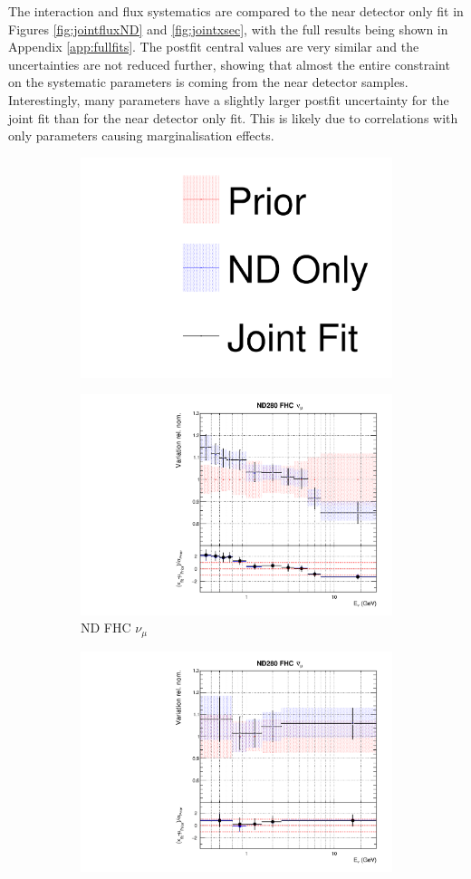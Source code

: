 The interaction and flux systematics are compared to the near detector only fit in Figures \ref{fig:jointfluxND} and \ref{fig:jointxsec}, with the full results being shown in Appendix \ref{app:fullfits}. The postfit central values are very similar and the uncertainties are not reduced further, showing that almost the entire constraint on the systematic parameters is coming from the near detector samples. Interestingly, many parameters have a slightly larger postfit uncertainty for the joint fit than for the near detector only fit. This is likely due to correlations with \SK only parameters causing marginalisation effects.

\begin{figure}[!htbp]
\centering
\begin{subfigure}{0.8\textwidth}
  \centering
  \includegraphics[width=0.24\linewidth]{figs/joint_leg}
\end{subfigure}
\begin{subfigure}{0.49\textwidth}
  \centering
  \includegraphics[width=0.99\linewidth]{figs/jointflux0}
  \caption{ND FHC $\nu_{\mu}$}
\end{subfigure}
\begin{subfigure}{0.49\textwidth}
  \centering
  \includegraphics[width=0.99\linewidth]{figs/jointflux1}

\end{subfigure}
\end{figure}

